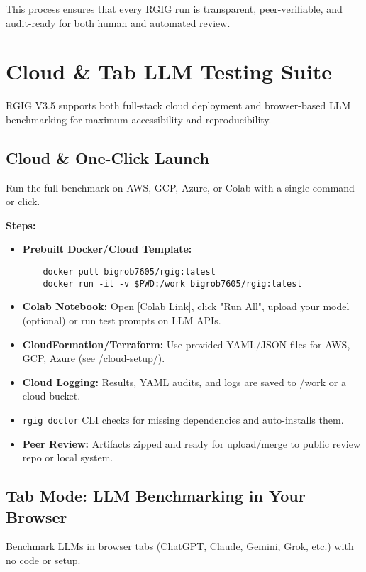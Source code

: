 This process ensures that every RGIG run is transparent, peer-verifiable, and audit-ready for both human and automated review.

\section*{Cloud \& Tab LLM Testing Suite}
RGIG V3.5 supports both full-stack cloud deployment and browser-based LLM benchmarking for maximum accessibility and reproducibility.

\subsection*{Cloud \& One-Click Launch}
Run the full benchmark on AWS, GCP, Azure, or Colab with a single command or click.

\textbf{Steps:}
\begin{itemize}
  \item \textbf{Prebuilt Docker/Cloud Template:}
    \begin{verbatim}
    docker pull bigrob7605/rgig:latest
    docker run -it -v $PWD:/work bigrob7605/rgig:latest
    \end{verbatim}
  \item \textbf{Colab Notebook:} Open [Colab Link], click "Run All", upload your model (optional) or run test prompts on LLM APIs.
  \item \textbf{CloudFormation/Terraform:} Use provided YAML/JSON files for AWS, GCP, Azure (see /cloud-setup/).
  \item \textbf{Cloud Logging:} Results, YAML audits, and logs are saved to /work or a cloud bucket.
  \item \texttt{rgig doctor} CLI checks for missing dependencies and auto-installs them.
  \item \textbf{Peer Review:} Artifacts zipped and ready for upload/merge to public review repo or local system.
\end{itemize}

\subsection*{Tab Mode: LLM Benchmarking in Your Browser}
Benchmark LLMs in browser tabs (ChatGPT, Claude, Gemini, Grok, etc.) with no code or setup.

